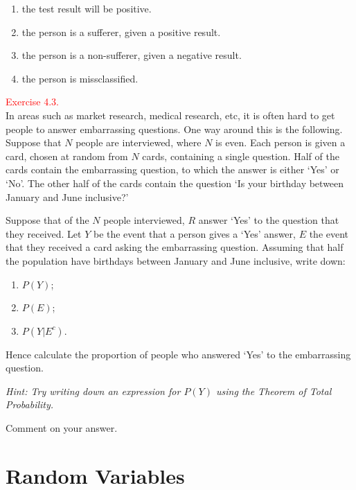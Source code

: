 \documentclass[
]{book}
\providecommand{\tightlist}{%
  \setlength{\itemsep}{0pt}\setlength{\parskip}{0pt}}
\begin{document}
\begin{enumerate}
\def\labelenumi{(\alph{enumi})}
\tightlist
\item
  the test result will be positive.\\
\item
  the person is a sufferer, given a positive result.\\
\item
  the person is a non-sufferer, given a negative result.\\
\item
  the person is missclassified.
\end{enumerate}

\leavevmode{}%
\textcolor{red}{Exercise 4.3.}\\
In areas such as market research, medical research, etc, it is often hard to get people to
answer embarrassing questions. One way around this is the following. Suppose that \(N\) people
are interviewed, where \(N\) is even. Each person is given a card, chosen at random from \(N\)
cards, containing a single question. Half of the cards contain the embarrassing question, to
which the answer is either `Yes' or `No'. The other half of the cards contain the question `Is your
birthday between January and June inclusive?'

Suppose that of the \(N\) people interviewed, \(R\) answer `Yes' to the question that they received.
Let \(Y\) be the event that a person gives a `Yes' answer, \(E\) the event that they received a card
asking the embarrassing question. Assuming that half the population have birthdays between
January and June inclusive, write down:

\begin{enumerate}
\def\labelenumi{(\alph{enumi})}
\tightlist
\item
  \(P(Y)\);\\
\item
  \(P(E)\);\\
\item
  \(P(Y|E^c)\).
\end{enumerate}

Hence calculate the proportion of people who answered `Yes' to the embarrassing question.

\emph{Hint: Try writing down an expression for \(P(Y)\) using the Theorem of Total Probability.}

Comment on your answer.

\hypertarget{rv}{%
\chapter{Random Variables}\label{rv}}
\end{document}

